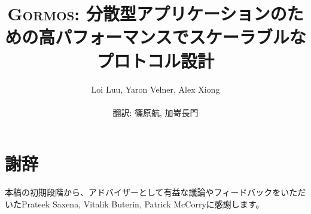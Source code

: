 \documentclass{styles/llncs}
\newcommand{\codename}{{\scshape Gormos}\xspace}
\begin{document}
\title{
  \codename: 分散型アプリケーションのための高パフォーマンスでスケーラブルなプロトコル設計
}
\author{
    Loi Luu, Yaron Velner, Alex Xiong\\
    \\
    \vspace{10pt}
    翻訳: 篠原航, 加嵜長門\\
}


{\def\addcontentsline#1#2#3{}\maketitle}


\setcounter{tocdepth}{2}
\tableofcontents
\newpage



\section{謝辞}
本稿の初期段階から、アドバイザーとして有益な議論やフィードバックをいただいたPrateek Saxena, Vitalik Buterin, Patrick McCorryに感謝します。





% 
\end{document}
